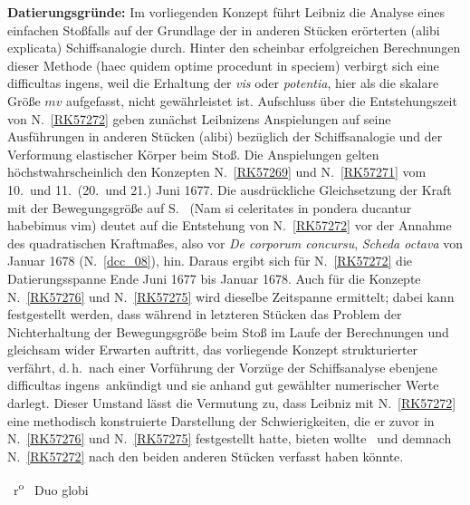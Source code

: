 \begin{ledgroup}
\footnotesize
\pstart
\noindent%
\textbf{Datierungsgründe:} %
Im vorliegenden Konzept führt Leibniz die Analyse eines einfachen Stoßfalls auf der Grundlage der in anderen Stücken erörterten 
%
(\glqq alibi explicata\grqq) Schiffsanalogie durch.
%
Hinter den scheinbar erfolgreichen Berechnungen dieser Methode (\glqq haec quidem optime procedunt in speciem\grqq)
%
verbirgt sich eine \glqq difficultas ingens\grqq, weil die Erhaltung der \textit{vis}  oder \textit{potentia},
%
hier als die skalare Größe $mv$ aufgefasst, nicht gewährleistet ist.
%
\pend
%
\pstart
Aufschluss über die Entstehungszeit von N.~\ref{RK57272} geben zunächst Leibnizens Anspielungen auf seine Ausführungen in anderen Stücken (\glqq alibi\grqq)
%
bezüglich der Schiffsanalogie und der Verformung elastischer Körper beim Stoß.
%
Die Anspielungen gelten höchstwahrscheinlich den Konzepten N.~\ref{RK57269} und N.~\ref{RK57271} vom 10.\ und 11.\ (20.\ und 21.) Juni 1677.
%
Die ausdrückliche Gleichsetzung der Kraft mit der Bewegungsgröße auf S.~ (\glqq Nam si celeritates in pondera ducantur habebimus vim\grqq)
%
deutet auf die Entstehung von N.~\ref{RK57272} vor der Annahme des quadratischen Kraftmaßes,
%
also vor \textit{De corporum concursu}, \textit{Scheda octava} von Januar 1678 (N.~\ref{dcc_08}), hin.
%
Daraus ergibt sich für N.~\ref{RK57272} die Datierungsspanne Ende Juni 1677 bis Januar 1678.
%
Auch für die Konzepte N.~\ref{RK57276} und N.~\ref{RK57275} wird dieselbe Zeitspanne ermittelt; 
%
dabei kann festgestellt werden, dass 
%
während in letzteren Stücken das Problem der Nichterhaltung der Bewegungsgröße beim Stoß
%
im Laufe der Berechnungen und gleichsam wider Erwarten auftritt,
%
das vorliegende Konzept strukturierter verfährt, d.\,h.\ nach einer Vorführung der Vorzüge der Schiffsanalyse
%
ebenjene \glqq difficultas ingens\grqq\ ankündigt und sie anhand gut gewählter numerischer Werte darlegt.
%
Dieser Umstand lässt die Vermutung zu, dass Leibniz mit N.~\ref{RK57272} eine methodisch konstruierte Darstellung
%
der Schwierigkeiten, die er zuvor in N.~\ref{RK57276} und N.~\ref{RK57275} festgestellt hatte, bieten wollte
%
\textendash\ und demnach N.~\ref{RK57272} nach den beiden anderen Stücken verfasst haben könnte.
\pend
%
\end{ledgroup}
%
%
\frenchspacing
\vspace{8mm}
\pstart%
\normalsize%
\noindent%
~r\textsuperscript{o}\rbrack\
%
%
%
%
Duo globi\protect{}
